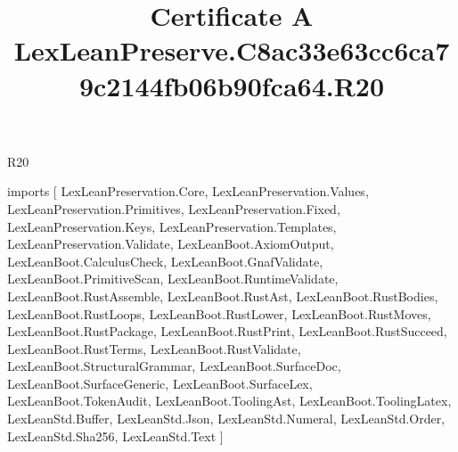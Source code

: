 \begin{lexlean}{R20}
\title{Certificate A LexLeanPreserve.C8ac33e63cc6ca79c2144fb06b90fca64.R20}
\begin{coremodule}
imports [
  LexLeanPreservation.Core,
  LexLeanPreservation.Values,
  LexLeanPreservation.Primitives,
  LexLeanPreservation.Fixed,
  LexLeanPreservation.Keys,
  LexLeanPreservation.Templates,
  LexLeanPreservation.Validate,
  LexLeanBoot.AxiomOutput,
  LexLeanBoot.CalculusCheck,
  LexLeanBoot.GnafValidate,
  LexLeanBoot.PrimitiveScan,
  LexLeanBoot.RuntimeValidate,
  LexLeanBoot.RustAssemble,
  LexLeanBoot.RustAst,
  LexLeanBoot.RustBodies,
  LexLeanBoot.RustLoops,
  LexLeanBoot.RustLower,
  LexLeanBoot.RustMoves,
  LexLeanBoot.RustPackage,
  LexLeanBoot.RustPrint,
  LexLeanBoot.RustSucceed,
  LexLeanBoot.RustTerms,
  LexLeanBoot.RustValidate,
  LexLeanBoot.StructuralGrammar,
  LexLeanBoot.SurfaceDoc,
  LexLeanBoot.SurfaceGeneric,
  LexLeanBoot.SurfaceLex,
  LexLeanBoot.TokenAudit,
  LexLeanBoot.ToolingAst,
  LexLeanBoot.ToolingLatex,
  LexLeanStd.Buffer,
  LexLeanStd.Json,
  LexLeanStd.Numeral,
  LexLeanStd.Order,
  LexLeanStd.Sha256,
  LexLeanStd.Text
]


\end{coremodule}
\end{lexlean}
